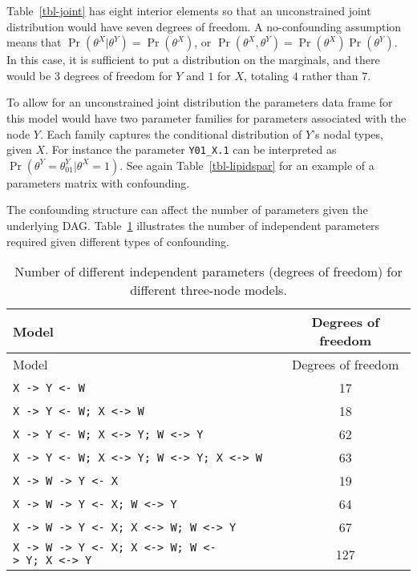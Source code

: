 \documentclass[
  11pt,
  article]{jss}
\begin{document}
Table~\ref{tbl-joint} has eight interior elements so that an
unconstrained joint distribution would have seven degrees of freedom. A
no-confounding assumption means that
\(\Pr(\theta^X | \theta^Y) = \Pr(\theta^X)\), or
\(\Pr(\theta^X, \theta^Y) = \Pr(\theta^X)\Pr(\theta^Y)\). In this case,
it is sufficient to put a distribution on the marginals, and there would
be \(3\) degrees of freedom for \(Y\) and \(1\) for \(X\), totaling
\(4\) rather than \(7\).

To allow for an unconstrained joint distribution the parameters data
frame for this model would have two parameter families for parameters
associated with the node \(Y\). Each family captures the conditional
distribution of \(Y\)'s nodal types, given \(X\). For instance the
parameter \texttt{Y01\_X.1} can be interpreted as
\(\Pr(\theta^Y = \theta^Y_{01} | \theta^X=1)\). See again
Table~\ref{tbl-lipidspar} for an example of a parameters matrix with
confounding.

The confounding structure can affect the number of parameters given the
underlying DAG. Table~\ref{tbl-dof} illustrates the number of
independent parameters required given different types of confounding.

\hypertarget{tbl-dof}{}
\begin{longtable}[]{@{}lc@{}}
\caption{\label{tbl-dof}Number of different independent parameters
(degrees of freedom) for different three-node models.}\tabularnewline
\toprule\noalign{}
Model & Degrees of freedom \\
\midrule\noalign{}
\endfirsthead
\toprule\noalign{}
Model & Degrees of freedom \\
\midrule\noalign{}
\endhead
\bottomrule\noalign{}
\endlastfoot
\texttt{X\ -\textgreater{}\ Y\ \textless{}-\ W} & 17 \\
\texttt{X\ -\textgreater{}\ Y\ \textless{}-\ W;\ X\ \textless{}-\textgreater{}\ W}
& 18 \\
\texttt{X\ -\textgreater{}\ Y\ \textless{}-\ W;\ X\ \textless{}-\textgreater{}\ Y;\ W\ \textless{}-\textgreater{}\ Y}
& 62 \\
\texttt{X\ -\textgreater{}\ Y\ \textless{}-\ W;\ X\ \textless{}-\textgreater{}\ Y;\ W\ \textless{}-\textgreater{}\ Y;\ X\ \textless{}-\textgreater{}\ W}
& 63 \\
\texttt{X\ -\textgreater{}\ W\ -\textgreater{}\ Y\ \textless{}-\ X} &
19 \\
\texttt{X\ -\textgreater{}\ W\ -\textgreater{}\ Y\ \textless{}-\ X;\ W\ \textless{}-\textgreater{}\ Y}
& 64 \\
\texttt{X\ -\textgreater{}\ W\ -\textgreater{}\ Y\ \textless{}-\ X;\ X\ \textless{}-\textgreater{}\ W;\ W\ \textless{}-\textgreater{}\ Y}
& 67 \\
\texttt{X\ -\textgreater{}\ W\ -\textgreater{}\ Y\ \textless{}-\ X;\ X\ \textless{}-\textgreater{}\ W;\ W\ \textless{}-\textgreater{}\ Y;\ X\ \textless{}-\textgreater{}\ Y}
& 127 \\
\end{longtable}
\end{document}

